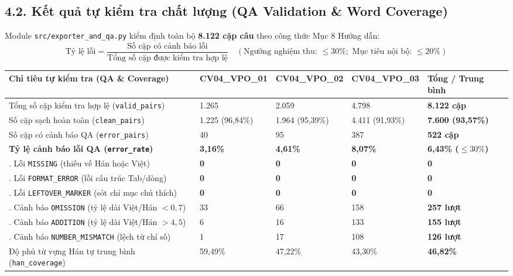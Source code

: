 \documentclass[11pt,a4paper]{article}
\begin{document}
\subsection{4.2. Kết quả tự kiểm tra chất lượng (QA Validation \& Word Coverage)}

Module \texttt{src/exporter\_and\_qa.py} kiểm định toàn bộ \textbf{8.122 cặp câu} theo công thức Mục 8 Hướng dẫn:
\[
\text{Tỷ lệ lỗi} = \frac{\text{Số cặp có cảnh báo lỗi}}{\text{Tổng số cặp được kiểm tra hợp lệ}} \quad (\text{Ngưỡng nghiệm thu: } \le 30\%; \text{ Mục tiêu nội bộ: } \le 20\%)
\]

\vspace{0.15em}
\begin{table}[h!]
\centering
\small
\begin{tabular}{L{5.6cm} C{2.1cm} C{2.1cm} C{2.1cm} C{2.5cm}}
\toprule
\textbf{Chỉ tiêu tự kiểm tra (QA \& Coverage)} & \textbf{CV04\_VPO\_01} & \textbf{CV04\_VPO\_02} & \textbf{CV04\_VPO\_03} & \textbf{Tổng / Trung bình} \\
\midrule
Tổng số cặp kiểm tra hợp lệ (\texttt{valid\_pairs}) & 1.265 & 2.059 & 4.798 & \textbf{8.122 cặp} \\
Số cặp sạch hoàn toàn (\texttt{clean\_pairs}) & 1.225 (96,84\%) & 1.964 (95,39\%) & 4.411 (91,93\%) & \textbf{7.600 (93,57\%)} \\
Số cặp có cảnh báo QA (\texttt{error\_pairs}) & 40 & 95 & 387 & \textbf{522 cặp} \\
\textbf{Tỷ lệ cảnh báo lỗi QA (\texttt{error\_rate})} & \textbf{3,16\%} & \textbf{4,61\%} & \textbf{8,07\%} & \textbf{6,43\% ($\le 30\%$)} \\
\midrule
{}. Lỗi \texttt{MISSING} (thiếu vế Hán hoặc Việt) & \textbf{0} & \textbf{0} & \textbf{0} & \textbf{0} \\
. Lỗi \texttt{FORMAT\_ERROR} (lỗi cấu trúc Tab/dòng) & \textbf{0} & \textbf{0} & \textbf{0} & \textbf{0} \\
. Lỗi \texttt{LEFTOVER\_MARKER} (sót chỉ mục chú thích) & \textbf{0} & \textbf{0} & \textbf{0} & \textbf{0} \\
. Cảnh báo \texttt{OMISSION} (tỷ lệ dài Việt/Hán $< 0,7$) & 33 & 66 & 158 & \textbf{257 lượt} \\
. Cảnh báo \texttt{ADDITION} (tỷ lệ dài Việt/Hán $> 4,5$) & 6 & 16 & 133 & \textbf{155 lượt} \\
. Cảnh báo \texttt{NUMBER\_MISMATCH} (lệch từ chỉ số) & 1 & 17 & 108 & \textbf{126 lượt} \\
\midrule
Độ phủ từ vựng Hán tự trung bình (\texttt{han\_coverage}) & 59,49\% & 47,22\% & 43,30\% & \textbf{46,82\%} \\

\end{tabular}
\end{table}
\end{document}
